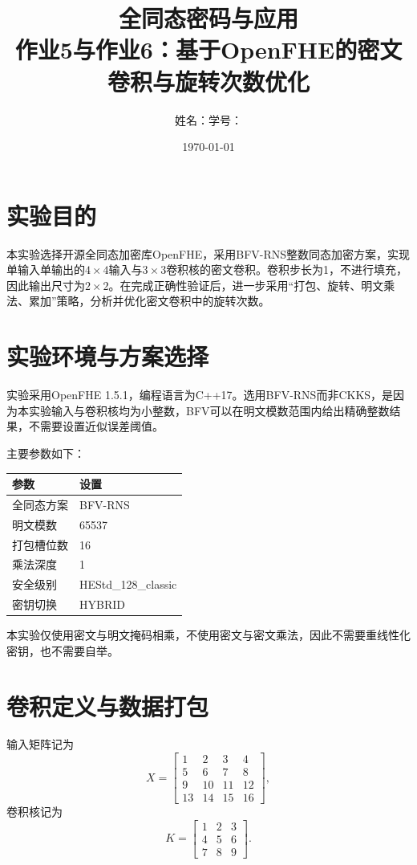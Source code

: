 \documentclass[UTF8,a4paper,12pt]{ctexart}
\title{全同态密码与应用\\作业5与作业6：基于OpenFHE的密文卷积与旋转次数优化}
\author{姓名：\underline{\hspace{4cm}}\quad 学号：\underline{\hspace{4cm}}}
\date{\today}
\begin{document}
\maketitle

\section{实验目的}
本实验选择开源全同态加密库OpenFHE，采用BFV-RNS整数同态加密方案，实现单输入单输出的$4\times4$输入与$3\times3$卷积核的密文卷积。卷积步长为1，不进行填充，因此输出尺寸为$2\times2$。在完成正确性验证后，进一步采用“打包、旋转、明文乘法、累加”策略，分析并优化密文卷积中的旋转次数。

\section{实验环境与方案选择}
实验采用OpenFHE 1.5.1，编程语言为C++17。选用BFV-RNS而非CKKS，是因为本实验输入与卷积核均为小整数，BFV可以在明文模数范围内给出精确整数结果，不需要设置近似误差阈值。

主要参数如下：
\begin{table}[H]
\centering
\begin{tabular}{ll}
\toprule
参数 & 设置\\
\midrule
全同态方案 & BFV-RNS\\
明文模数 & 65537\\
打包槽位数 & 16\\
乘法深度 & 1\\
安全级别 & HEStd\_128\_classic\\
密钥切换 & HYBRID\\
\bottomrule
\end{tabular}
\end{table}

本实验仅使用密文与明文掩码相乘，不使用密文与密文乘法，因此不需要重线性化密钥，也不需要自举。

\section{卷积定义与数据打包}
输入矩阵记为
\[
X=\begin{bmatrix}
1&2&3&4\\
5&6&7&8\\
9&10&11&12\\
13&14&15&16
\end{bmatrix},
\]
卷积核记为
\[
K=\begin{bmatrix}
1&2&3\\
4&5&6\\
7&8&9
\end{bmatrix}.
\]
\end{document}
